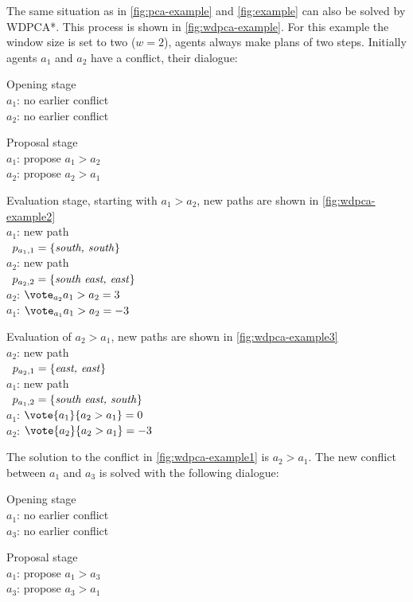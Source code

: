 The same situation as in \autoref{fig:pca-example} and \autoref{fig:example} 
can also be solved by WDPCA*. This process is shown in 
\autoref{fig:wdpca-example}. For this example the window size is set to two ($w 
= 2$), 
agents always make plans of two steps. Initially agents $a_1$ and $a_2$ have a 
conflict, their dialogue:

Opening stage
\\ \-\qquad $a_1$: no earlier conflict
\\ \-\qquad $a_2$: no earlier conflict

Proposal stage
\\ \-\qquad $a_1$: propose $a_1 > a_2$
\\ \-\qquad $a_2$: propose $a_2 > a_1$

Evaluation stage, starting with $a_1 > a_2$, new paths are shown in 
\autoref{fig:wdpca-example2}
\\ \-\qquad $a_1$: new path
\\ \-\qquad\quad\,\; $p_{a_1,1} = \{\text{\emph{south, south}}\}$
\\ \-\qquad $a_2$: new path
\\ \-\qquad\quad\,\; $p_{a_2,2} = \{\text{\emph{south east, east}}\}$
\\ \-\qquad $a_2$: $\vote_{a_2}{a_1 > a_2} = 3$
\\ \-\qquad $a_1$: $\vote_{a_1}{a_1 > a_2} = -3$

Evaluation of $a_2 > a_1$, new paths are shown in \autoref{fig:wdpca-example3}
\\ \-\qquad $a_2$: new path
\\ \-\qquad\quad\,\; $p_{a_2,1} = \{\text{\emph{east, east}}\}$
\\ \-\qquad $a_1$: new path
\\ \-\qquad\quad\,\; $p_{a_1,2} = \{\text{\emph{south east, south}}\}$
\\ \-\qquad $a_1$: $\vote{a_1}{a_2 > a_1} = 0$
\\ \-\qquad $a_2$: $\vote{a_2}{a_2 > a_1} = -3$

The solution to the conflict in \autoref{fig:wdpca-example1} is $a_2 > a_1$. 
The new conflict between $a_1$ and $a_3$ is solved with the following dialogue:

Opening stage
\\ \-\qquad $a_1$: no earlier conflict
\\ \-\qquad $a_3$: no earlier conflict

Proposal stage
\\ \-\qquad $a_1$: propose $a_1 > a_3$
\\ \-\qquad $a_3$: propose $a_3 > a_1$

